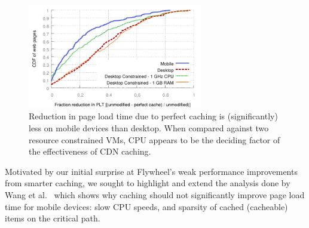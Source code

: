 
\begin{figure}[t]
    \includegraphics[width=3in]{../graphs/percent_plt_reduction/percent_reduction_linear.pdf}
    \caption[]{\label{fig:percent_reduction_linear}Reduction in page load time due to perfect caching is (significantly) less on mobile devices than desktop. When compared against two resource constrained VMs, CPU appears to be the deciding factor of the effectiveness of CDN caching.}
\end{figure}


Motivated by our initial surprise at Flywheel's weak performance improvements
from smarter caching, we sought to highlight and extend the analysis done by
Wang et al.~\cite{wang2013demystifying} which shows why caching should not
significantly improve page load time for mobile devices: slow CPU
speeds, and sparsity of cached (cacheable) items on the critical
path.


